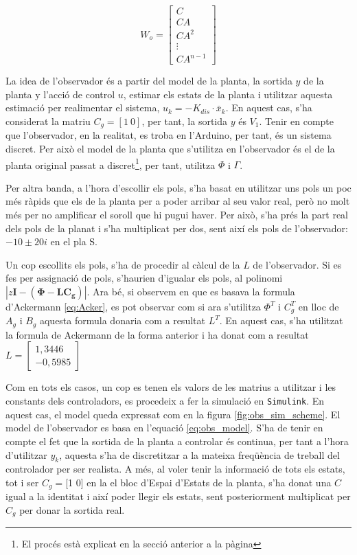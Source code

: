 \documentclass[12pt,a4paper,final,twoside,openright]{report}
\begin{document}
\begin{equation}\label{eq:observabilitat}
W_o = \begin{bmatrix}
C\\
C A\\
C A^2\\
\vdots\\
C A^{n-1}
\end{bmatrix}
\end{equation}

La idea de l'observador és a partir del model de la planta, la sortida $y$ de la planta y l'acció de control $u$, estimar els estats de la planta i utilitzar aquesta estimació per realimentar el sistema, $u_k = -K_{dis}\cdot\bar{x}_k$. En aquest cas, s'ha considerat la matriu $C_g=[1 ~ 0]$, per tant, la sortida $y$ és $V_1$. Tenir en compte que l'observador, en la realitat, es troba en l'Arduino, per tant, és un sistema discret. Per això el model de la planta que s'utilitza en l'observador és el de la planta original passat a discret\footnote{El procés està explicat en la secció anterior a la pàgina \pageref{pag:trans_phi_gam}}, per tant, utilitza $\Phi$ i $\Gamma$.

Per altra banda, a l'hora d'escollir els pols, s'ha basat en utilitzar uns pols un poc més ràpids que els de la planta per a poder arribar al seu valor real, però no molt més per no amplificar el soroll que hi pugui haver. Per això, s'ha prés la part real dels pols de la planat i s'ha multiplicat per dos, sent així els pols de l'observador: $-10\pm20i$ en el pla S. 

Un cop escollits els pols, s'ha de procedir al càlcul de la $L$ de l'observador. Si es fes per assignació de pols, s'haurien d'igualar els pols, al polinomi $|z\mathbf{I}-(\mathbf{\Phi} - \mathbf{L C_g})|$. Ara bé, si observem en que es basava la formula d'Ackermann \eqref{eq:Acker}, es pot observar com si ara s'utilitza $\Phi^T$ i $C_g^T$ en lloc de $A_g$ i $B_g$ aquesta formula donaria com a resultat $L^T$. En aquest cas, s'ha utilitzat la formula de Ackermann de la forma anterior i ha donat com a resultat $L=\begin{bmatrix}
1,3446\\
-0,5985
\end{bmatrix}$

Com en tots els casos, un cop es tenen els valors de les matrius a utilitzar i les constants dels controladors, es procedeix a fer la simulació en \texttt{Simulink}. En aquest cas, el model queda expressat com en la figura \ref{fig:obs_sim_scheme}. El model de l'observador es basa en l'equació \eqref{eq:obs_model}. S'ha de tenir en compte el fet que la sortida de la planta a controlar és continua, per tant a l'hora d'utilitzar $y_k$, aquesta s'ha de discretitzar a la mateixa freqüència de treball del controlador per ser realista. A més, al voler tenir la informació de tots els estats, tot i ser $C_g=$[1 0] en la el bloc d'Espai d'Estats de la planta, s'ha donat una $C$ igual a la identitat i així poder llegir els estats, sent posteriorment multiplicat per $C_g$ per donar la sortida real.
\end{document}
